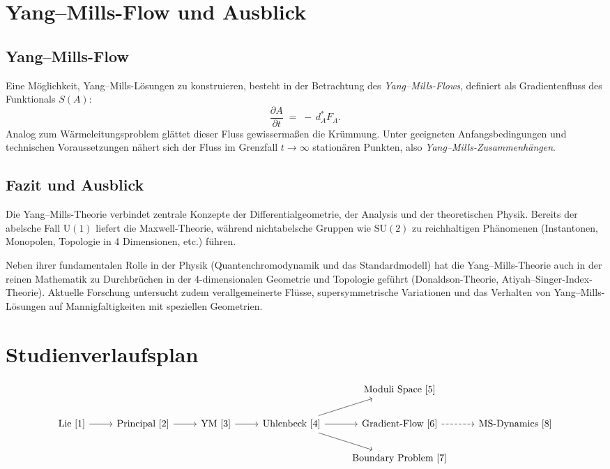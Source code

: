 \documentclass[10pt, letterpaper]{article}
\theoremstyle{custom}
\theoremstyle{definition}
\begin{document}
\section{Yang--Mills-Flow und Ausblick}
\subsection{Yang--Mills-Flow}
Eine Möglichkeit, Yang--Mills-Lösungen zu konstruieren, besteht in der Betrachtung des \emph{Yang--Mills-Flows}, definiert als Gradientenfluss des Funktionals \(S(A)\):
\[
\frac{\partial A}{\partial t}
\;=\;
-\, d_A^* F_A.
\]
Analog zum Wärmeleitungsproblem glättet dieser Fluss gewissermaßen die Krümmung. Unter geeigneten Anfangsbedingungen und technischen Voraussetzungen nähert sich der Fluss im Grenzfall \(t\to\infty\) stationären Punkten, also \emph{Yang--Mills-Zusammenhängen}.

\subsection{Fazit und Ausblick}
Die Yang--Mills-Theorie verbindet zentrale Konzepte der Differentialgeometrie, der Analysis und der theoretischen Physik. Bereits der abelsche Fall \(\mathrm{U}(1)\) liefert die Maxwell-Theorie, während nichtabelsche Gruppen wie \(\mathrm{SU}(2)\) zu reichhaltigen Phänomenen (Instantonen, Monopolen, Topologie in 4 Dimensionen, etc.) führen.  

Neben ihrer fundamentalen Rolle in der Physik (Quantenchromodynamik und das Standardmodell) hat die Yang--Mills-Theorie auch in der reinen Mathematik zu Durchbrüchen in der 4-dimensionalen Geometrie und Topologie geführt (Donaldson-Theorie, Atiyah--Singer-Index-Theorie). Aktuelle Forschung untersucht zudem verallgemeinerte Flüsse, supersymmetrische Variationen und das Verhalten von Yang--Mills-Lösungen auf Mannigfaltigkeiten mit speziellen Geometrien.








\pagebreak



\section{Studienverlaufsplan}

{\small
\[
\begin{tikzcd}
& & & & \text{Moduli Space [5]} \\
\text{Lie [1]} \arrow[r] & \text{Principal [2]} \arrow[r] & \text{YM [3]} \arrow[r] &  \text{Uhlenbeck [4]} \arrow[r]\arrow[ru]\arrow[rd] & \text{Gradient-Flow [6]} \arrow[r,dashed] & \text{MS-Dynamics [8]} \\
& & & & \text{Boundary Problem [7]}\\
\end{tikzcd}
\]
}
\end{document}
